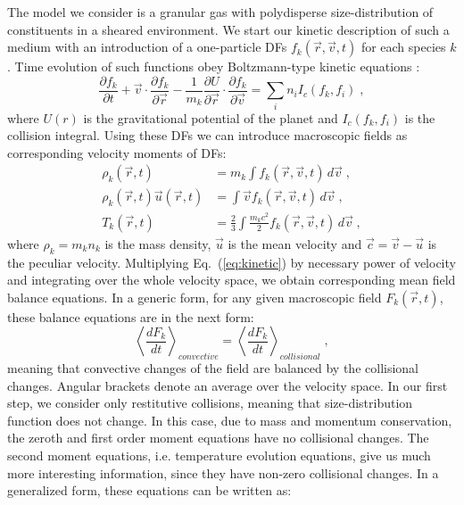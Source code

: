 \documentclass[11pt, notitlepage]{article} %
\begin{document}
The model we consider is a granular gas with polydisperse size-distribution 
of constituents in a sheared environment. We start our kinetic description of such a medium 
with an introduction of a one-particle DFs $f_k(\vec{r}, \vec{v}, t)$ for each species $k$. Time evolution of such functions 
obey Boltzmann-type kinetic equations \citep{Haff1983, Brilliantov2004}:
\begin{equation}\label{eq:kinetic}
	\frac{\partial f_k}{\partial t}+\vec{v}\cdot\frac{\partial f_k}{\partial\vec{r}}-
	\frac{1}{m_k}\frac{\partial U}{\partial\vec{r}}\cdot\frac{\partial f_k}{\partial\vec{v}}=
	\sum_i n_iI_c(f_k,f_i)\;,
\end{equation}
where $U(r)$ is the gravitational potential of the planet and $I_c(f_k, f_i)$ is the collision integral. Using these DFs we 
can introduce macroscopic fields as corresponding velocity moments of DFs:
\begin{equation}
	\begin{split}
		\rho_k(\vec{r}, t) &= m_k\int f_k(\vec{r}, \vec{v}, t)\,d\vec{v}\;,\\
		\rho_k(\vec{r}, t)\vec{u}(\vec{r}, t) &= \int \vec{v}f_k(\vec{r}, \vec{v}, t)\,d\vec{v}\;,\\
		T_k(\vec{r}, t) &= \frac{2}{3}\int \frac{m_k c^2}{2}f_k(\vec{r}, \vec{v}, t)\,d\vec{v}\;,
	\end{split}
\end{equation}
where $\rho_k=m_kn_k$ is the mass density, $\vec{u}$ is the mean velocity and $\vec{c}=\vec{v}-\vec{u}$ is the peculiar velocity.
Multiplying Eq.~(\ref{eq:kinetic}) by necessary power of velocity and integrating over the whole velocity space, we obtain 
corresponding mean field balance equations. In a generic form, for any given macroscopic field $F_k(\vec{r},t)$, these balance equations 
are in the next form:
\begin{equation}\label{eq:balance}
	\left\langle\frac{dF_k}{dt}\right\rangle_{convective}=\left\langle\frac{dF_k}{dt}\right\rangle_{collisional}\;,
\end{equation}
meaning that convective changes of the field are balanced by the collisional changes. Angular brackets denote an average over 
the velocity space. In our first step, we consider only restitutive 
collisions, meaning that size-distribution function does not change. In this case, due to mass and momentum conservation, the 
zeroth and first order moment equations have no collisional changes. The second moment equations, i.e. temperature evolution equations,
give us much more interesting information, since they have non-zero collisional changes. In a generalized form, these equations can be written as:
\end{document}
